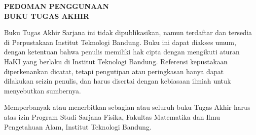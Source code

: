 

\begin{center}
    \textbf{\Large{PEDOMAN PENGGUNAAN\\BUKU TUGAS AKHIR}}
\end{center}

\vspace{1.5cm}

\noindent Buku Tugas Akhir Sarjana ini tidak dipublikasikan, namun terdaftar dan tersedia di Perpustakaan Institut Teknologi Bandung. Buku ini dapat diakses umum, dengan ketentuan bahwa penulis memiliki hak cipta dengan mengikuti aturan HaKI yang berlaku di Institut Teknologi Bandung. Referensi kepustakaan diperkenankan dicatat, tetapi pengutipan atau peringkasan hanya dapat dilakukan seizin penulis, dan harus disertai dengan kebiasaan ilmiah untuk menyebutkan sumbernya.

Memperbanyak atau menerbitkan sebagian atau seluruh buku Tugas Akhir harus atas izin Program Studi Sarjana Fisika, Fakultas Matematika dan Ilmu Pengetahuan Alam, Institut Teknologi Bandung.